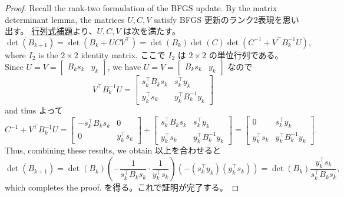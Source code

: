\documentclass[0_main]{subfiles}
\begin{document}
\begin{proof}
    \ifEn
        Recall the rank-two formulation of the BFGS update.
        By the matrix determinant lemma, the matrices $U, C, V$ satisfy
    \else
        BFGS 更新のランク2表現を思い出す。
        \href{https://en.wikipedia.org/wiki/Matrix_determinant_lemma}{行列式補題}より、$U, C, V$ は次を満たす。
    \fi
    \begin{equation*}
        \det(B_{k+1}) =\det(B_k + U C V^\top)=\det(B_k)\det(C) \det \left(C^{-1} + V^\top B_k^{-1} U\right),
    \end{equation*}
    \ifEn
        where $I_2$ is the $2\times 2$ identity matrix.
    \else
        ここで $I_2$ は $2\times 2$ の単位行列である。
    \fi
    \ifEn
        Since $U=V=\begin{bmatrix}B_k s_k & y_k\end{bmatrix}$, we have
    \else
        $U=V=\begin{bmatrix}B_k s_k & y_k\end{bmatrix}$ なので
    \fi
    \begin{equation*}
        V^\top B_k^{-1} U = \begin{bmatrix} s_k^\top B_k s_k & s_k^\top y_k \\ y_k^\top s_k     & y_k^\top B_k^{-1} y_k \end{bmatrix}
    \end{equation*}
    \ifEn
        and thus
    \else
        よって
    \fi
    \begin{equation*}
        C^{-1} + V^\top B_k^{-1} U
        =
        \begin{bmatrix}-s_k^\top B_k s_k & 0 \\ 0 & y_k^\top s_k\end{bmatrix} +
        \begin{bmatrix} s_k^\top B_k s_k & s_k^\top y_k \\ y_k^\top s_k     & y_k^\top B_k^{-1} y_k \end{bmatrix}
        =
        \begin{bmatrix}0 & s_k^\top y_k \\ y_k^\top s_k & y_k^\top B_k^{-1} y_k \end{bmatrix}.
    \end{equation*}
    \ifEn
        Thus, combining these results, we obtain
    \else
        以上を合わせると
    \fi
    \begin{equation*}
        \det(B_{k+1})
        = \det(B_k) \left(-\frac{1}{s_k^\top B_k s_k} \cdot \frac{1}{y_k^\top s_k}\right) \left(- (s_k^\top y_k)(y_k^\top s_k)\right)
        = \det(B_k) \frac{y_k^\top s_k}{s_k^\top B_k s_k},
    \end{equation*}
    \ifEn
        which completes the proof.
    \else
        を得る。これで証明が完了する。
    \fi
    \myQED
\end{proof}
\end{document}
